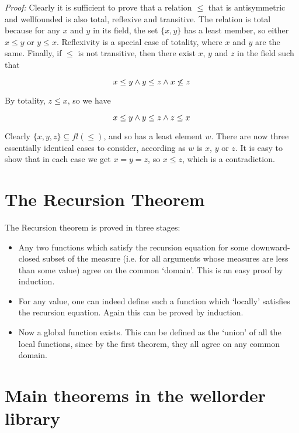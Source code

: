 {\em Proof:} Clearly it is sufficient to prove that a relation $\leq$ that is
antisymmetric and wellfounded is also total, reflexive and transitive. The
relation is total because for any $x$ and $y$ in its field, the set $\{x,y\}$
has a least member, so either $x \leq y$ or $y \leq x$. Reflexivity is a
special case of totality, where $x$ and $y$ are the same. Finally, if $\leq$ is
not transitive, then there exist $x$, $y$ and $z$ in the field such that

$$ x \leq y \wedge y \leq z \wedge x \not\leq z $$

By totality, $z \leq x$, so we have

$$ x \leq y \wedge y \leq z \wedge z \leq x $$

Clearly $\{x,y,z\} \subseteq fl(\leq)$, and so has a least element $w$. There
are now three essentially identical cases to consider, according as $w$ is $x$,
$y$ or $z$. It is easy to show that in each case we get $x = y = z$, so
$x \leq z$, which is a contradiction.

\section{The Recursion Theorem}

The Recursion theorem is proved in three stages:

\begin{itemize}

\item Any two functions which satisfy the recursion equation for some
downward-closed subset of the measure (i.e. for all arguments whose measures
are less than some value) agree on the common `domain'. This is an easy proof
by induction.

\item For any value, one can indeed define such a function which `locally'
satisfies the recursion equation. Again this can be proved by induction.

\item Now a global function exists. This can be defined as the `union' of all
the local functions, since by the first theorem, they all agree on any common
domain.

\end{itemize}

\section{Main theorems in the wellorder library}


